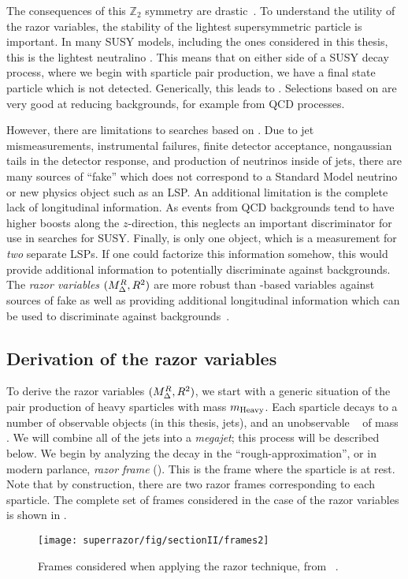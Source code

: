 The consequences of this $\mathbb{Z}_2$ symmetry are drastic~\cite{susyPrimer}.
To understand the utility of the razor variables, the stability of the lightest supersymmetric particle is important.
In many SUSY models, including the ones considered in this thesis, this is the lightest neutralino \lsp.
This means that on either side of a SUSY decay process, where we begin with sparticle pair production, we have a final state particle which is not detected.
Generically, this leads to \met.
Selections based on \met are very good at reducing  backgrounds, for example from QCD processes.

However, there are limitations to searches based on \met.
Due to jet mismeasurements, instrumental failures, finite detector acceptance, nongaussian tails in the detector response, and production of neutrinos inside of jets, there are many sources of ``fake'' \met which does not correspond to a Standard Model neutrino or new physics object such as an LSP.
An additional limitation is the complete lack of longitudinal information.
As events from QCD backgrounds tend to have higher boosts along the $z$-direction, this neglects an important discriminator for use in searches for SUSY.
Finally, \met is only one object, which is a measurement for \textit{two} separate LSPs.
If one could factorize this information somehow, this would provide additional information to potentially discriminate against backgrounds.
The \textit{razor variables} $(M_{\Delta}^{R}, R^2)$ are more robust than \met-based variables against sources of fake \met as well as providing additional longitudinal information which can be used to discriminate against backgrounds~\cite{Rogan:2010kb,Buckley:2013kua}.

\subsection{Derivation of the razor variables}

To derive the razor variables $(M_{\Delta}^{R}, R^2)$, we start with a generic situation of the pair production of heavy sparticles with mass $m_{\mathrm{Heavy}}$.\footnotemark
{}
Each sparticle decays to a number of observable objects (in this thesis, jets), and an unobservable \lsp~ of mass \mlsp.
We will combine all of the jets into a \textit{megajet}; this process will be described below.
We begin by analyzing the decay in the ``rough-approximation'', or in modern parlance, \textit{razor frame} (\rframe).
This is the frame where the sparticle is at rest.
Note that by construction, there are two razor frames corresponding to each sparticle.
The complete set of frames considered in the case of the razor variables is shown in .
\begin{figure}[tbp]
\caption{Frames considered when applying the razor technique, from ~\cite{Buckley:2013kua}.} \label{fig:razor_frames}
\texttt{[image: superrazor/fig/sectionII/frames2]}
\end{figure}


